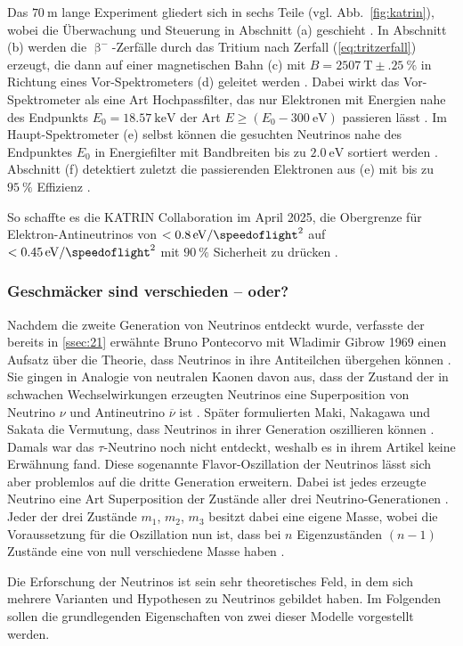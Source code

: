 \documentclass[a4paper,12pt]{article}
\newcommand{\figref}[1]{Abb.~\ref{#1}}
\begin{document}
\par
Das $\qty{70}{\meter}$ lange Experiment gliedert sich in sechs Teile (vgl. \figref{fig:katrin}), wobei die Überwachung und Steuerung in Abschnitt (a) geschieht \cite[6]{Kleesiek2019}. In Abschnitt (b) werden die $\upbeta^-$-Zerfälle durch das Tritium nach Zerfall (\ref{eq:tritzerfall}) erzeugt, die dann auf einer magnetischen Bahn (c) mit $B=\qty{2507}{\tesla} \pm \qty{,25}{\percent}$ \cite[180]{Aker2025} in Richtung eines Vor-Spektrometers (d) geleitet werden \cite[6]{Kleesiek2019}. Dabei wirkt das Vor-Spektrometer als eine Art Hochpassfilter, das nur Elektronen mit Energien nahe des Endpunkts $E_0=\qty{18,57}{\kilo\electronvolt}$ der Art $E\geq (E_0- \qty{300}{\electronvolt})$ passieren lässt \cite[1--3]{Prall2012}. Im Haupt-Spektrometer (e) selbst können die gesuchten Neutrinos nahe des Endpunktes $E_0$ in Energiefilter mit Bandbreiten bis zu $\qty{2,0}{\electronvolt}$ sortiert werden \cite[181]{Aker2025}. Abschnitt (f) detektiert zuletzt die passierenden Elektronen aus (e) mit bis zu $\qty{95}{\percent}$ Effizienz \cite[181]{Aker2025}. \par
So schaffte es die KATRIN Collaboration im April 2025, die Obergrenze für Elektron-Antineutrinos von $<\qty[per-mode=symbol]{,8}{\electronvolt\per\square\speedoflight}$ auf $<\qty[per-mode=symbol]{,45}{\electronvolt\per\square\speedoflight}$ mit $\qty{90}{\percent}$ Sicherheit zu drücken \cite[180]{Aker2025}.

\subsubsection{Geschmäcker sind verschieden -- oder?} \label{sssec:223}
Nachdem die zweite Generation von Neutrinos entdeckt wurde, verfasste der bereits in \cref{ssec:21} erwähnte Bruno Pontecorvo mit Wladimir Gibrow 1969 einen Aufsatz über die Theorie, dass Neutrinos in ihre Antiteilchen übergehen können \cite{Bilenky2014}. Sie gingen in Analogie von neutralen Kaonen davon aus, dass der Zustand der in schwachen Wechselwirkungen erzeugten Neutrinos eine Superposition von Neutrino $\nu$ und Antineutrino $\overline{\nu}$ ist \cite[10]{Athar2022}. Später formulierten Maki, Nakagawa und Sakata die Vermutung, dass Neutrinos in ihrer Generation oszillieren können \cite[870--871]{Maki1962}. Damals war das $\tau$-Neutrino noch nicht entdeckt, weshalb es in ihrem Artikel keine Erwähnung fand. Diese sogenannte Flavor-Oszillation der Neutrinos lässt sich aber problemlos auf die dritte Generation erweitern. Dabei ist jedes erzeugte Neutrino eine Art Superposition der Zustände aller drei Neutrino-Generationen \cite[10]{Athar2022}. Jeder der drei Zustände $m_1$, $m_2$, $m_3$ besitzt dabei eine eigene Masse, wobei die Voraussetzung für die Oszillation nun ist, dass bei $n$ Eigenzuständen $(n-1)$ Zustände eine von null verschiedene Masse haben \cite[10]{Athar2022}. \par 
Die Erforschung der Neutrinos ist sein sehr theoretisches Feld, in dem sich mehrere Varianten und Hypothesen zu Neutrinos gebildet haben. Im Folgenden sollen die grundlegenden Eigenschaften von zwei dieser Modelle vorgestellt werden. \par
\end{document}
